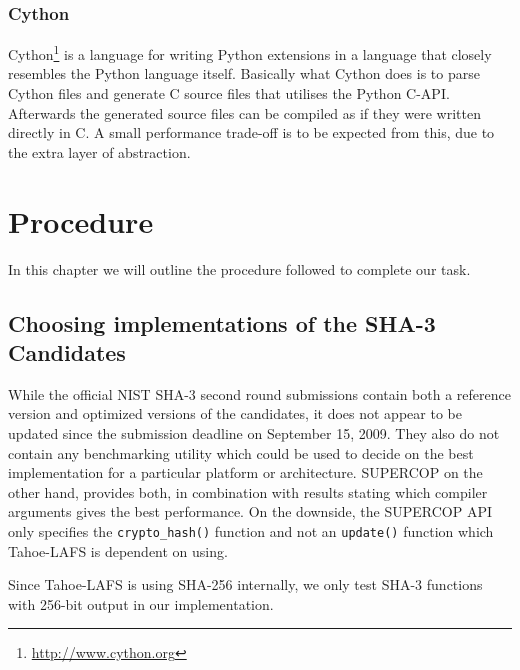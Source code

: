 \documentclass[english,12pt,a4paper]{book}
\begin{document}
\subsection{Cython}
Cython\footnote{\url{http://www.cython.org}} is a language for writing Python
extensions in a language that closely resembles the Python language itself.
Basically what Cython does is to parse Cython files and generate C source files
that utilises the Python C-API. Afterwards the generated source files can be
compiled as if they were written directly in C. A small performance trade-off is
to be expected from this, due to the extra layer of abstraction.

\chapter{Procedure}

%

In this chapter we will outline the procedure followed to complete our task.

\section{Choosing implementations of the SHA-3 Candidates}

While the official \ac{NIST} \ac{SHA}-3 second round submissions contain both
a reference version and optimized versions of the candidates, it does not
appear to be updated since the submission deadline on September 15, 2009. They
also do not contain any benchmarking utility which could be used to decide on
the best implementation for a particular platform or architecture. \ac{SUPERCOP}
on the other hand, provides both, in combination with results stating which
compiler arguments gives the best performance. On the downside, the
\ac{SUPERCOP} \ac{API} only specifies the \texttt{crypto\_hash()} function and
not an \texttt{update()} function which Tahoe-\ac{LAFS} is dependent on using.

Since Tahoe-\ac{LAFS} is using \ac{SHA}-256 internally, we only test \ac{SHA}-3
functions with 256-bit output in our implementation. 
\end{document}
